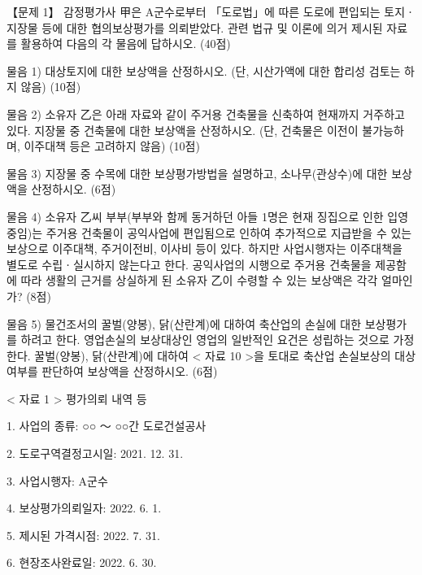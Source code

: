 \begin{longquestion}{【문제 1】}
감정평가사 甲은 A군수로부터 「도로법」에 따른 도로에 편입되는 토지ㆍ지장물 등에 대한 협의보상평가를 의뢰받았다. 관련 법규 및 이론에 의거 제시된 자료를 활용하여 다음의 각 물음에 답하시오. (40점) \par
\medskip\noindent 물음 1) 대상토지에 대한 보상액을 산정하시오. (단, 시산가액에 대한 합리성 검토는 하지 않음) (10점) \par
\medskip\noindent 물음 2) 소유자 乙은 아래 자료와 같이 주거용 건축물을 신축하여 현재까지 거주하고 있다. 지장물 중 건축물에 대한 보상액을 산정하시오. (단, 건축물은 이전이 불가능하며, 이주대책 등은 고려하지 않음) (10점) \par
\medskip\noindent 물음 3) 지장물 중 수목에 대한 보상평가방법을 설명하고, 소나무(관상수)에 대한 보상액을 산정하시오. (6점) \par
\medskip\noindent 물음 4) 소유자 乙씨 부부(부부와 함께 동거하던 아들 1명은 현재 징집으로 인한 입영 중임)는 주거용 건축물이 공익사업에 편입됨으로 인하여 추가적으로 지급받을 수 있는 보상으로 이주대책, 주거이전비, 이사비 등이 있다. 하지만 사업시행자는 이주대책을 별도로 수립ㆍ실시하지 않는다고 한다. 공익사업의 시행으로 주거용 건축물을 제공함에 따라 생활의 근거를 상실하게 된 소유자 乙이 수령할 수 있는 보상액은 각각 얼마인가? (8점) \par
\medskip\noindent 물음 5) 물건조서의 꿀벌(양봉), 닭(산란계)에 대하여 축산업의 손실에 대한 보상평가를 하려고 한다. 영업손실의 보상대상인 영업의 일반적인 요건은 성립하는 것으로 가정한다. 꿀벌(양봉), 닭(산란계)에 대하여 < 자료 10 >을 토대로 축산업 손실보상의 대상여부를 판단하여 보상액을 산정하시오. (6점) \par
< 자료 1 > 평가의뢰 내역 등 \par
1. 사업의 종류: ○○ ～ ○○간 도로건설공사 \par
2. 도로구역결정고시일: 2021. 12. 31. \par
3. 사업시행자: A군수 \par
4. 보상평가의뢰일자: 2022. 6. 1. \par
5. 제시된 가격시점: 2022. 7. 31. \par
6. 현장조사완료일: 2022. 6. 30. \par

\end{longquestion}
